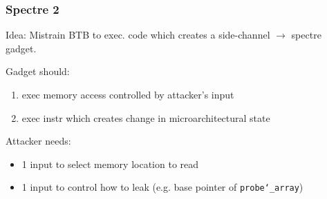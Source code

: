 \subsubsection{Spectre 2}
Idea: Mistrain BTB to exec. code which creates a side-channel $\xrightarrow{}$ spectre gadget.

Gadget should:\vspace{-1.5mm}
\begin{enumerate}
    \item exec memory access controlled by attacker's input
    \item exec instr which creates change in microarchitectural state
\end{enumerate}

Attacker needs:\vspace{-1.5mm}
\begin{itemize}
    \item 1 input to select memory location to read
    \item 1 input to control how to leak (e.g. base pointer of \texttt{probe\char`_array})
\end{itemize}